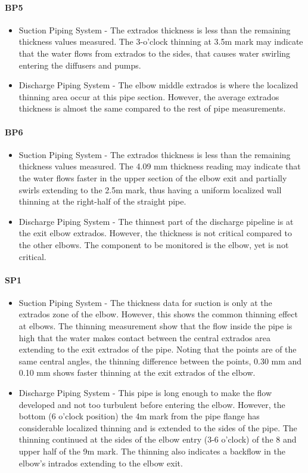 \paragraph{\textbf{BP5}}
\begin{itemize}
	\item Suction Piping System - The extrados thickness is less than the remaining thickness values measured. The 3-o'clock thinning at 3.5m mark may indicate that the water flows from extrados to the sides, that causes water swirling entering the diffusers and pumps.
	\item	Discharge Piping System - The elbow middle extrados is where the localized thinning area occur at this pipe section. However, the average extrados thickness is almost the same compared to the rest of pipe measurements.
\end{itemize}

\paragraph{\textbf{BP6}}
\begin{itemize}
	\item Suction Piping System - The extrados thickness is less than the remaining thickness values measured. The 4.09 mm thickness reading may indicate that the water flows faster in the upper section of the elbow exit and partially swirls extending to the 2.5m mark, thus having a uniform localized wall thinning at the right-half of the straight pipe.
	\item	Discharge Piping System - The thinnest part of the discharge pipeline is at the exit elbow extrados. However, the thickness is not critical compared to the other elbows. The component to be monitored is the elbow, yet is not critical.
\end{itemize}

\paragraph{\textbf{SP1}}
\begin{itemize}
	\item Suction Piping System - The thickness data for suction is only at the extrados zone of the elbow. However, this shows the common thinning effect at elbows. The thinning measurement show that the flow inside the pipe is high that the water makes contact between the central extrados area extending to the exit extrados of the pipe. Noting that the points are of the same central angles, the thinning difference between the points, 0.30 mm and 0.10 mm shows faster thinning at the exit extrados of the elbow.
	\item	Discharge Piping System - This pipe is long enough to make the flow developed and not too turbulent before entering the elbow. However, the bottom (6 o'clock position) the 4m mark from the pipe flange has considerable localized thinning and is extended to the sides of the pipe. The thinning continued at the sides of the elbow entry (3-6 o'clock) of the 8 and upper half of the 9m mark. The thinning also indicates a backflow in the elbow's intrados extending to the elbow exit.
\end{itemize}

